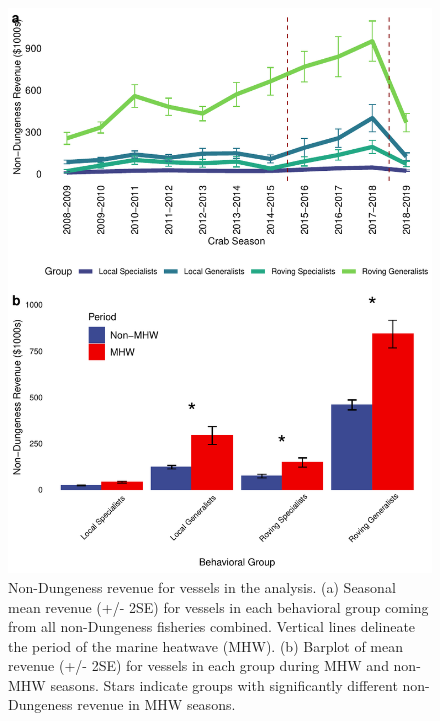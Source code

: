 \documentclass[]{elsarticle} %
\begin{document}
\begin{figure}%
\includegraphics [width=\linewidth]{fig_nondcrb_revenue.pdf}
\caption{Non-Dungeness revenue for vessels in the analysis. (a) Seasonal mean revenue (+/- 2SE) for vessels in each behavioral group coming from all non-Dungeness fisheries combined. Vertical lines delineate the period of the marine heatwave (MHW). (b) Barplot of mean revenue (+/- 2SE) for vessels in each group during MHW and non-MHW seasons. Stars indicate groups with significantly different non-Dungeness revenue in MHW seasons.}
\label{fig:revenue}
\end{figure}
\end{document}
